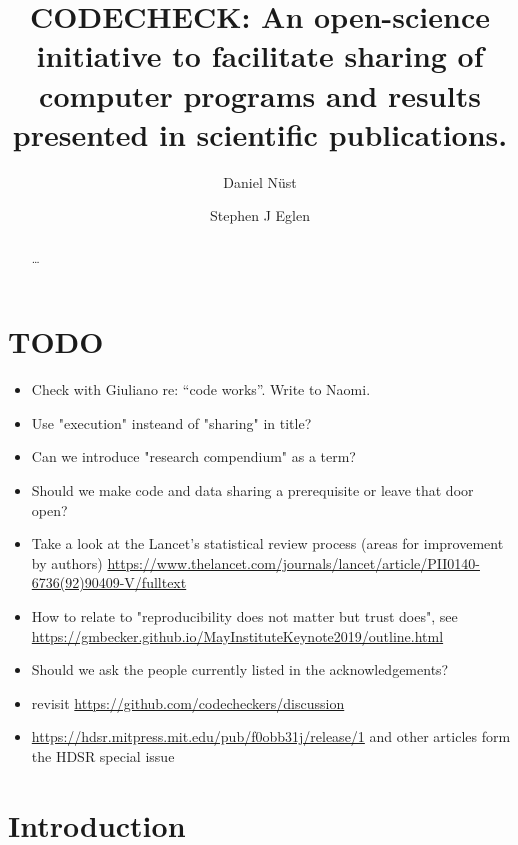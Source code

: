 \documentclass[12pt]{article}
\begin{document}
\title{CODECHECK: An open-science initiative to facilitate sharing of
  computer programs and results presented in scientific publications.}
\author[1,$\ast$]{Daniel N\"{u}st}
\author[2,$\ast$]{Stephen J Eglen}
\maketitle
\begin{abstract}
\ldots{}
\end{abstract}

\section*{TODO}\label{todo}

\begin{itemize}
\item Check with Giuliano re: ``code works''. Write to Naomi.
\item Use "execution" insteand of "sharing" in title?
\item Can we introduce "research compendium" as a term?
\item Should we make code and data sharing a prerequisite or leave that door open?
\item Take a look at the Lancet's statistical review process (areas for improvement by authors) \url{https://www.thelancet.com/journals/lancet/article/PII0140-6736(92)90409-V/fulltext}
\item How to relate to "reproducibility does not matter but trust does", see \url{https://gmbecker.github.io/MayInstituteKeynote2019/outline.html}
\item Should we ask the people currently listed in the acknowledgements?
\item revisit \url{https://github.com/codecheckers/discussion}
\item \url{https://hdsr.mitpress.mit.edu/pub/f0obb31j/release/1} and other articles form the HDSR special issue
\end{itemize}

\section*{Introduction}\label{introduction}
\end{document}
